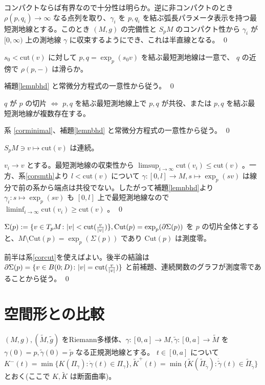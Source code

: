 \documentclass[dvipdfmx,a4paper]{jsreport}
\theoremstyle{definition}
\newcommand{\der}{\partial}
\renewcommand{\tilde}{\widetilde}
\begin{document}
\prf コンパクトならば有界なので十分性は明らか。逆に非コンパクトのとき $\rho(p,q_i) \to \infty$ なる点列を取り、$\gamma_i$ を $p,q_i$ を結ぶ弧長パラメータ表示を持つ最短測地線とする。このとき $(M,g)$ の完備性と $S_pM$ のコンパクト性から $\gamma_i$ が $[0,\infty)$ 上の測地線 $\gamma$ に収束するようにでき、これは半直線となる。 \qed

\cor\label{corsmth} $s_0<\mbox{cut}(v)$ に対して $p,q=\exp_p(s_0v)$ を結ぶ最短測地線は一意で、 $q$ の近傍で $\rho(p,-)$ は滑らか。

\prf 補題\ref{lemnbhd} と常微分方程式の一意性から従う。 \qed

\cor\label{corcut} $q$ が $p$ の切片 $\iff$ $p,q$ を結ぶ最短測地線上で $p,q$ が共役、または $p,q$ を結ぶ最短測地線が複数存在する。

\prf 系 \ref{corminimal}、補題\ref{lemnbhd} と常微分方程式の一意性から従う。 \qed

\lem $S_pM \ni v \mapsto \mbox{cut}(v)$ は連続。

\prf $v_i \to v$ とする。最短測地線の収束性から $\limsup_{i \to \infty} \mbox{cut}(v_i) \leq \mbox{cut}(v)$ 。一方、系\ref{corsmth}より $l<\mbox{cut}(v)$ について $\gamma:[0,l] \to M,s \mapsto \exp_p(sv)$ は線分で前の系から端点は共役でない。したがって補題\ref{lemnbhd}より $\gamma_i:s \mapsto \exp_p(sv)$ も $[0,l]$ 上で最短測地線なので $\liminf_{i \to \infty} \mbox{cut}(v_i) \geq \mbox{cut}(v)$ 。 \qed

\cor\label{corzero} $\Sigma(p):=\{v \in T_pM \colon |v|<\mbox{cut}({v \over |v|})\},\mbox{Cut}(p)=\exp_p(\der \Sigma(p))$ を $p$ の切片全体とすると、$M \setminus \mbox{Cut}(p)=\exp_p(\Sigma(p))$ であり $\mbox{Cut}(p)$ は測度零。

\prf 前半は系\ref{corcut}を使えばよい。後半の結論は $\der \Sigma(p)=\{v \in B(0;D) \colon |v|=\mbox{cut}({v \over |v|})\}$ と前補題、連続関数のグラフが測度零であることから従う。 \qed

\section{空間形との比較}

$(M,g),(\tilde{M},\tilde{g})$ をRiemann多様体、$\gamma:[0,a] \to M,\tilde{\gamma}:[0,a] \to \tilde{M}$ を $\gamma(0)=p,\tilde{\gamma}(0)=\tilde{p}$ なる正規測地線とする。 $t \in [0,a]$ について $K^-(t)=\min\{K(\Pi_{\gamma}) \colon \dot{\gamma}(t) \in \Pi_{\gamma}\},\tilde{K}^+(t)=\min\{\tilde{K}(\tilde{\Pi}_{\tilde{\gamma}}) \colon \dot{\tilde{\gamma}}(t) \in \tilde{\Pi}_{\tilde{\gamma}}\}$ とおく(ここで $K,\tilde{K}$ は断面曲率)。
\end{document}
